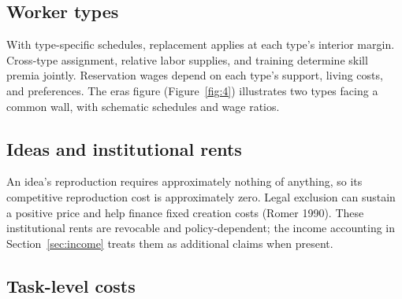 \documentclass[12pt]{article}
\theoremstyle{plain}
\theoremstyle{definition}
\theoremstyle{remark}
\begin{document}
\subsection{Worker types}\label{app:types}

With type-specific schedules, replacement applies at each type's interior margin. Cross-type assignment, relative labor supplies, and training determine skill premia jointly. Reservation wages depend on each type's support, living costs, and preferences. The eras figure (Figure~\ref{fig:4}) illustrates two types facing a common wall, with schematic schedules and wage ratios.

\subsection{Ideas and institutional rents}\label{app:ideas}

An idea's reproduction requires approximately nothing of anything, so its competitive reproduction cost is approximately zero. Legal exclusion can sustain a positive price and help finance fixed creation costs (Romer 1990). These institutional rents are revocable and policy-dependent; the income accounting in Section~\ref{sec:income} treats them as additional claims when present.

\subsection{Task-level costs}\label{app:tasklevel}
\end{document}
